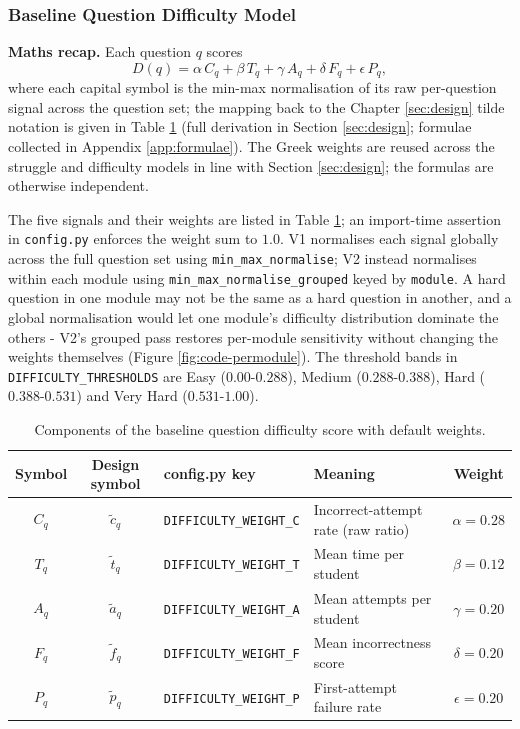 \subsubsection{Baseline Question Difficulty Model}

\textbf{Maths recap.}
Each question $q$ scores
\[
D(q) = \alpha\, C_q + \beta\, T_q + \gamma\, A_q + \delta\, F_q + \epsilon\, P_q,
\]
where each capital symbol is the min-max normalisation of its raw per-question signal across the question set; the mapping back to the Chapter \ref{sec:design} tilde notation is given in Table \ref{tab:difficulty-5sig} (full derivation in Section \ref{sec:design}; formulae collected in Appendix \ref{app:formulae}). The Greek weights are reused across the struggle and difficulty models in line with Section \ref{sec:design}; the formulas are otherwise independent.

The five signals and their weights are listed in Table \ref{tab:difficulty-5sig}; an import-time assertion in \texttt{config.py} enforces the weight sum to $1.0$.
V1 normalises each signal globally across the full question set using \texttt{min\_max\_normalise}; V2 instead normalises within each module using \texttt{min\_max\_normalise\_grouped} keyed by \texttt{module}.
A hard question in one module may not be the same as a hard question in another, and a global normalisation would let one module's difficulty distribution dominate the others - V2's grouped pass restores per-module sensitivity without changing the weights themselves (Figure \ref{fig:code-permodule}).
The threshold bands in \texttt{DIFFICULTY\_THRESHOLDS} are Easy ($0.00$-$0.288$), Medium ($0.288$-$0.388$), Hard ($0.388$-$0.531$) and Very Hard ($0.531$-$1.00$).\label{sec:thresholds-difficulty}


\begin{table}[H]
\centering
\caption{Components of the baseline question difficulty score with default weights.}
\label{tab:difficulty-5sig}
\small
\begin{tabular}{|c|c|l|p{}|c|}
\hline
\textbf{Symbol} & \textbf{Design symbol} & \textbf{config.py key} & \textbf{Meaning} & \textbf{Weight} \\
\hline\hline
$C_q$ & $\tilde{c}_{q}$ & \texttt{DIFFICULTY\_WEIGHT\_C} & Incorrect-attempt rate (raw ratio)            & $\alpha = 0.28$   \\
\hline
$T_q$ & $\tilde{t}_{q}$ & \texttt{DIFFICULTY\_WEIGHT\_T} & Mean time per student                          & $\beta = 0.12$    \\
\hline
$A_q$ & $\tilde{a}_{q}$ & \texttt{DIFFICULTY\_WEIGHT\_A} & Mean attempts per student                      & $\gamma = 0.20$   \\
\hline
$F_q$ & $\tilde{f}_{q}$ & \texttt{DIFFICULTY\_WEIGHT\_F} & Mean incorrectness score                       & $\delta = 0.20$   \\
\hline
$P_q$ & $\tilde{p}_{q}$ & \texttt{DIFFICULTY\_WEIGHT\_P} & First-attempt failure rate                     & $\epsilon = 0.20$ \\
\hline
\end{tabular}
\end{table}


